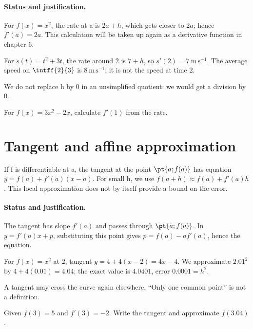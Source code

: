 \paragraph{Status and justification.} For $f(x)=x^2$, the rate at a is $2a+h$, which gets closer to $2a$; hence $f\prime(a)=2a$. This calculation will be taken up again as a derivative function in chapter 6.
\begin{example}For $s(t)=t^2+3t$, the rate around 2 is $7+h$, so $s\prime(2)=7\ \mathrm{m\,s^{-1}}$. The average speed on $\intff{2}{3}$ is $8\ \mathrm{m\,s^{-1}}$; it is not the speed at time 2.\end{example}\label{C04-EX2}
\begin{pitfall}We do not replace h by 0 in an unsimplified quotient: we would get a division by 0.\end{pitfall}
\begin{application}For $f(x)=3x^2-2x$, calculate $f\prime(1)$ from the rate.\end{application}\label{C04-AP2}
\section{Tangent and affine approximation}\label{C04-U3}
\begin{keypoint}
If f is differentiable at a, the tangent at the point $\pt{a;f(a)}$ has equation $y=f(a)+f\prime(a)(x-a)$. For small h, we use $f(a+h)\approx f(a)+f\prime(a)h$. This local approximation does not by itself provide a bound on the error.
\end{keypoint}
\paragraph{Status and justification.} The tangent has slope $f\prime(a)$ and passes through $\pt{a;f(a)}$. In $y=f\prime(a)x+p$, substituting this point gives $p=f(a)-af\prime(a)$, hence the equation.
\begin{example}For $f(x)=x^2$ at 2, tangent $y=4+4(x-2)=4x-4$. We approximate $\num{2,01}^2$ by $4+4(\num{0,01})=\num{4,04}$; the exact value is $\num{4,0401}$, error $\num{0,0001}=h^2$.\end{example}\label{C04-EX3}
\begin{pitfall}A tangent may cross the curve again elsewhere. ``Only one common point'' is not a definition.\end{pitfall}
\begin{application}Given $f(3)=5$ and $f\prime(3)=-2$. Write the tangent and approximate $f(\num{3,04})$.\end{application}\label{C04-AP3}
